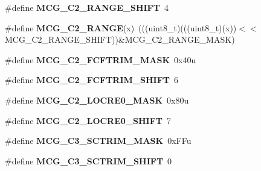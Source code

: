 \begin{DoxyCompactItemize}
\item 
\#define {\bfseries M\+C\+G\+\_\+\+C2\+\_\+\+R\+A\+N\+G\+E\+\_\+\+S\+H\+I\+FT}~4\hypertarget{group__MCG__Register__Masks_ga0198b0ee825233bd73c2681c2072e5d6}{}\label{group__MCG__Register__Masks_ga0198b0ee825233bd73c2681c2072e5d6}

\item 
\#define {\bfseries M\+C\+G\+\_\+\+C2\+\_\+\+R\+A\+N\+GE}(x)~(((uint8\+\_\+t)(((uint8\+\_\+t)(x))$<$$<$M\+C\+G\+\_\+\+C2\+\_\+\+R\+A\+N\+G\+E\+\_\+\+S\+H\+I\+FT))\&M\+C\+G\+\_\+\+C2\+\_\+\+R\+A\+N\+G\+E\+\_\+\+M\+A\+SK)\hypertarget{group__MCG__Register__Masks_gaaca8c6b60b8c40403204e606565281d2}{}\label{group__MCG__Register__Masks_gaaca8c6b60b8c40403204e606565281d2}

\item 
\#define {\bfseries M\+C\+G\+\_\+\+C2\+\_\+\+F\+C\+F\+T\+R\+I\+M\+\_\+\+M\+A\+SK}~0x40u\hypertarget{group__MCG__Register__Masks_ga45707a93b3c20e13c76dfda9ba5ff622}{}\label{group__MCG__Register__Masks_ga45707a93b3c20e13c76dfda9ba5ff622}

\item 
\#define {\bfseries M\+C\+G\+\_\+\+C2\+\_\+\+F\+C\+F\+T\+R\+I\+M\+\_\+\+S\+H\+I\+FT}~6\hypertarget{group__MCG__Register__Masks_ga59a90f18817b5c06e8d77879105becda}{}\label{group__MCG__Register__Masks_ga59a90f18817b5c06e8d77879105becda}

\item 
\#define {\bfseries M\+C\+G\+\_\+\+C2\+\_\+\+L\+O\+C\+R\+E0\+\_\+\+M\+A\+SK}~0x80u\hypertarget{group__MCG__Register__Masks_gae89f2e48b02a39563115d1a60dc8f16f}{}\label{group__MCG__Register__Masks_gae89f2e48b02a39563115d1a60dc8f16f}

\item 
\#define {\bfseries M\+C\+G\+\_\+\+C2\+\_\+\+L\+O\+C\+R\+E0\+\_\+\+S\+H\+I\+FT}~7\hypertarget{group__MCG__Register__Masks_gabc900505d9a12bd7a33c2a5e3cfdf02a}{}\label{group__MCG__Register__Masks_gabc900505d9a12bd7a33c2a5e3cfdf02a}

\item 
\#define {\bfseries M\+C\+G\+\_\+\+C3\+\_\+\+S\+C\+T\+R\+I\+M\+\_\+\+M\+A\+SK}~0x\+F\+Fu\hypertarget{group__MCG__Register__Masks_ga44433c6372539508fbf3090b591f3d89}{}\label{group__MCG__Register__Masks_ga44433c6372539508fbf3090b591f3d89}

\item 
\#define {\bfseries M\+C\+G\+\_\+\+C3\+\_\+\+S\+C\+T\+R\+I\+M\+\_\+\+S\+H\+I\+FT}~0\hypertarget{group__MCG__Register__Masks_ga8b5c3c55be188745fefec24b945110b7}{}\label{group__MCG__Register__Masks_ga8b5c3c55be188745fefec24b945110b7}


\end{DoxyCompactItemize}
